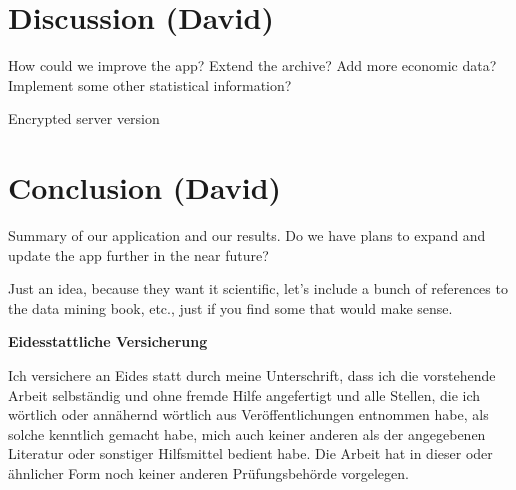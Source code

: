 \documentclass[12pt,a4paper]{article}
\begin{document}
\hypertarget{discussion-david}{%
\section{Discussion (David)}\label{discussion-david}}

How could we improve the app? Extend the archive? Add more economic data? Implement some other statistical information?

Encrypted server version

\hypertarget{conclusion-david}{%
\section{Conclusion (David)}\label{conclusion-david}}

Summary of our application and our results. Do we have plans to expand and update the app further in the near future?

Just an idea, because they want it scientific, let's include a bunch of references to the data mining book, etc., just if you find some that would make sense.

\newpage


\newpage
\textbf{Eidesstattliche Versicherung}

\bigskip

Ich versichere an Eides statt durch meine Unterschrift, dass ich die vorstehende Arbeit selbständig und ohne fremde Hilfe angefertigt und alle Stellen, die ich wörtlich oder annähernd wörtlich aus Veröffentlichungen entnommen habe, als solche kenntlich gemacht habe, mich auch keiner anderen als der angegebenen Literatur oder sonstiger Hilfsmittel bedient habe. Die Arbeit hat in dieser oder ähnlicher Form noch keiner anderen Prüfungsbehörde vorgelegen.

\vspace{1cm}
\rule{0pt}{2\baselineskip} %
\par\noindent{} \hfill\makebox[2.25in]{\hrulefill}%
\par\noindent\makebox[2.25in][l]{} \hfill{}%
\end{document}
